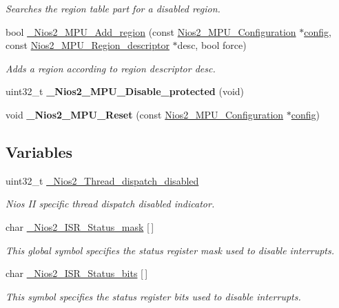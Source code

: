 \begin{DoxyCompactItemize}
\begin{DoxyCompactList}\small\item\em Searches the region table part for a disabled region. \end{DoxyCompactList}\item 
bool \mbox{\hyperlink{nios2-utility_8h_a68bf4897cc02ed096d6d417bf6571415}{\+\_\+\+Nios2\+\_\+\+M\+P\+U\+\_\+\+Add\+\_\+region}} (const \mbox{\hyperlink{structNios2__MPU__Configuration}{Nios2\+\_\+\+M\+P\+U\+\_\+\+Configuration}} $\ast$\mbox{\hyperlink{structconfig__s}{config}}, const \mbox{\hyperlink{structNios2__MPU__Region__descriptor}{Nios2\+\_\+\+M\+P\+U\+\_\+\+Region\+\_\+descriptor}} $\ast$desc, bool force)
\begin{DoxyCompactList}\small\item\em Adds a region according to region descriptor {\itshape desc}. \end{DoxyCompactList}\item 
\mbox{\label{nios2-utility_8h_a65c6e0da6213e4da81c90afd614267be}} 
uint32\+\_\+t {\bfseries \+\_\+\+Nios2\+\_\+\+M\+P\+U\+\_\+\+Disable\+\_\+protected} (void)
\item 
\mbox{\label{nios2-utility_8h_ac2d7e96e2fc3e82498fec6e1a2299b8e}} 
void {\bfseries \+\_\+\+Nios2\+\_\+\+M\+P\+U\+\_\+\+Reset} (const \mbox{\hyperlink{structNios2__MPU__Configuration}{Nios2\+\_\+\+M\+P\+U\+\_\+\+Configuration}} $\ast$\mbox{\hyperlink{structconfig__s}{config}})
\end{DoxyCompactItemize}
\subsection*{Variables}
\begin{DoxyCompactItemize}
\item 
uint32\+\_\+t \mbox{\hyperlink{nios2-utility_8h_af065794b1f232ce93bb2caee956c4e69}{\+\_\+\+Nios2\+\_\+\+Thread\+\_\+dispatch\+\_\+disabled}}
\begin{DoxyCompactList}\small\item\em Nios II specific thread dispatch disabled indicator. \end{DoxyCompactList}\item 
char \mbox{\hyperlink{nios2-utility_8h_ad44d03951a88738afe8fd6081ad2c6e9}{\+\_\+\+Nios2\+\_\+\+I\+S\+R\+\_\+\+Status\+\_\+mask}} \mbox{[}$\,$\mbox{]}
\begin{DoxyCompactList}\small\item\em This global symbol specifies the status register mask used to disable interrupts. \end{DoxyCompactList}\item 
char \mbox{\hyperlink{nios2-utility_8h_a716d831ea403d46ec0653819efa808c4}{\+\_\+\+Nios2\+\_\+\+I\+S\+R\+\_\+\+Status\+\_\+bits}} \mbox{[}$\,$\mbox{]}
\begin{DoxyCompactList}\small\item\em This symbol specifies the status register bits used to disable interrupts. \end{DoxyCompactList}\end{DoxyCompactItemize}


